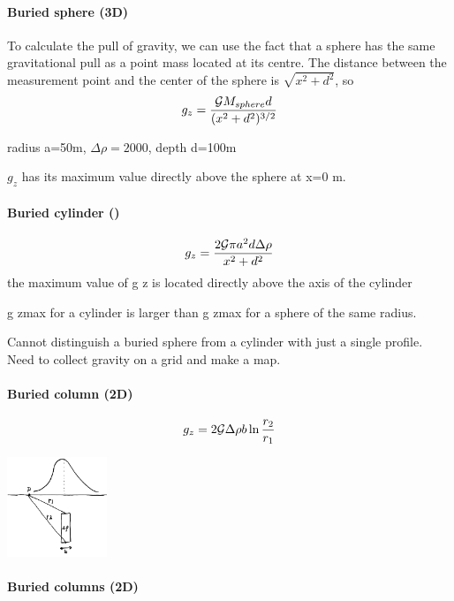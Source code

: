 
\paragraph{Buried sphere (3D)}

To calculate the pull of gravity, we can use the fact that a sphere has the same
gravitational pull as a point mass located at its centre. The distance between 
the measurement point and the center of the sphere is $\sqrt{x^2+d^2}$, so
\[
g_z = \frac{{\cal G} M_{sphere} d }{(x^2 + d^2)^{3/2}}
\]

radius a=50m, $\Delta \rho=2000$, depth d=100m

$g_z$ has its maximum value directly above the sphere at x=0 m.

\paragraph{Buried cylinder ()} 

\[
g_z=\frac{2 {\cal G} \pi a^2 d \Delta \rho}{x^2+d^2}
\]
the maximum value of g z is located directly above the axis of the cylinder

g zmax for a cylinder is larger than g zmax for a sphere of the same radius.

Cannot distinguish a buried sphere from a cylinder with just a single profile. Need to
collect gravity on a grid and make a map.

\paragraph{Buried column (2D)}

\[
g_z=2 {\cal G} \Delta \rho b \ln \frac{r_2}{r_1}
\]

\begin{center}
\includegraphics[width=3cm]{images/gravity/column}
\end{center}

\paragraph{Buried columns (2D)}

